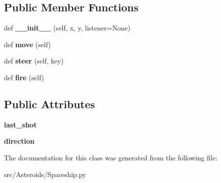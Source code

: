\subsection*{Public Member Functions}
\begin{DoxyCompactItemize}
\item 
def {\bfseries \+\_\+\+\_\+init\+\_\+\+\_\+} (self, x, y, listener=None)\hypertarget{classSpaceship_1_1Spaceship_a0ce8d5216e02a15f018cdb852a702a00}{}\label{classSpaceship_1_1Spaceship_a0ce8d5216e02a15f018cdb852a702a00}

\item 
def {\bfseries move} (self)\hypertarget{classSpaceship_1_1Spaceship_a9ed1701b8506b3287a3c0f376965eaa3}{}\label{classSpaceship_1_1Spaceship_a9ed1701b8506b3287a3c0f376965eaa3}

\item 
def {\bfseries steer} (self, key)\hypertarget{classSpaceship_1_1Spaceship_aaad85580a083d4fbb6c839f98224a6c5}{}\label{classSpaceship_1_1Spaceship_aaad85580a083d4fbb6c839f98224a6c5}

\item 
def {\bfseries fire} (self)\hypertarget{classSpaceship_1_1Spaceship_a7cf6faeb7488ab1a77fc5668076c1f35}{}\label{classSpaceship_1_1Spaceship_a7cf6faeb7488ab1a77fc5668076c1f35}

\end{DoxyCompactItemize}
\subsection*{Public Attributes}
\begin{DoxyCompactItemize}
\item 
{\bfseries last\+\_\+shot}\hypertarget{classSpaceship_1_1Spaceship_a56057cc944d63397439253ba0a070fce}{}\label{classSpaceship_1_1Spaceship_a56057cc944d63397439253ba0a070fce}

\item 
{\bfseries direction}\hypertarget{classSpaceship_1_1Spaceship_a8066f1ca4ab44ccd8287634d79607bd6}{}\label{classSpaceship_1_1Spaceship_a8066f1ca4ab44ccd8287634d79607bd6}

\end{DoxyCompactItemize}


The documentation for this class was generated from the following file\+:\begin{DoxyCompactItemize}
\item 
src/\+Asteroids/Spaceship.\+py\end{DoxyCompactItemize}
